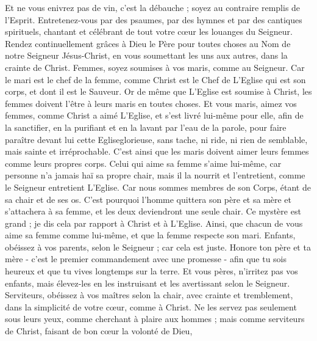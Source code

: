 \begin{multicols}{2}
Et ne vous enivrez pas de vin, c’est la débauche ; soyez au contraire remplis de l'Esprit.
Entretenez-vous par des psaumes, par des hymnes et par des cantiques spirituels, chantant et célébrant de tout votre cœur les louanges du Seigneur.
Rendez continuellement grâces à Dieu le Père pour toutes choses au Nom de notre Seigneur Jésus-Christ,
en vous soumettant les uns aux autres, dans la crainte de Christ.
Femmes, soyez soumises à vos maris, comme au Seigneur.
Car le mari est le chef de la femme, comme Christ est le Chef de L’Eglise qui est son corps, et dont il est le Sauveur.
Or de même que L’Eglise est soumise à Christ, les femmes doivent l’être à leurs maris en toutes choses.
Et vous maris, aimez vos femmes, comme Christ a aimé L’Eglise, et s'est livré lui-même pour elle,
afin de la sanctifier, en la purifiant et en la lavant par l’eau de la parole,
pour faire paraître devant lui cette Egliseglorieuse, sans tache, ni ride, ni rien de semblable, mais sainte et irréprochable.
C’est ainsi que les maris doivent aimer leurs femmes comme leurs propres corps. Celui qui aime sa femme s'aime lui-même,
car personne n'a jamais haï sa propre chair, mais il la nourrit et l'entretient, comme le Seigneur entretient L’Eglise.
Car nous sommes membres de son Corps, étant de sa chair et de ses os.
C'est pourquoi l'homme quittera son père et sa mère et s’attachera à sa femme, et les deux deviendront une seule chair.
Ce mystère est grand ; je dis cela par rapport à Christ et à L’Eglise.
Ainsi, que chacun de vous aime sa femme comme lui-même, et que la femme respecte son mari.
\VerseOne{}Enfants, obéissez à vos parents, selon le Seigneur ; car cela est juste.
Honore ton père et ta mère - c’est le premier commandement avec une promesse -
afin que tu sois heureux et que tu vives longtemps sur la terre.
Et vous pères, n'irritez pas vos enfants, mais élevez-les en les instruisant et les avertissant selon le Seigneur.
Serviteurs, obéissez à vos maîtres selon la chair, avec crainte et tremblement, dans la simplicité de votre cœur, comme à Christ.
Ne les servez pas seulement sous leurs yeux, comme cherchant à plaire aux hommes ; mais comme serviteurs de Christ, faisant de bon cœur la volonté de Dieu,

\end{multicols}
